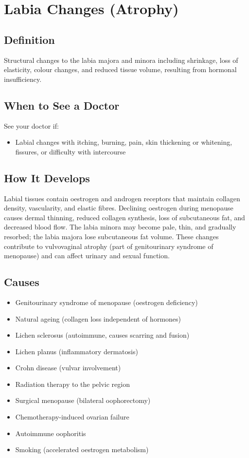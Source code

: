 \chapter{Labia Changes (Atrophy)}

\section*{Definition}
Structural changes to the labia majora and minora including shrinkage, loss of elasticity, colour changes, and reduced tissue volume, resulting from hormonal insufficiency.

\section*{When to See a Doctor}
See your doctor if:
\begin{itemize}
  \item Labial changes with itching, burning, pain, skin thickening or whitening, fissures, or difficulty with intercourse
\end{itemize}

\section*{How It Develops}
Labial tissues contain oestrogen and androgen receptors that maintain collagen density, vascularity, and elastic fibres. Declining oestrogen during menopause causes dermal thinning, reduced collagen synthesis, loss of subcutaneous fat, and decreased blood flow. The labia minora may become pale, thin, and gradually resorbed; the labia majora lose subcutaneous fat volume. These changes contribute to vulvovaginal atrophy (part of genitourinary syndrome of menopause) and can affect urinary and sexual function.

\section*{Causes}
\begin{itemize}
  \item Genitourinary syndrome of menopause (oestrogen deficiency)
  \item Natural ageing (collagen loss independent of hormones)
  \item Lichen sclerosus (autoimmune, causes scarring and fusion)
  \item Lichen planus (inflammatory dermatosis)
  \item Crohn disease (vulvar involvement)
  \item Radiation therapy to the pelvic region
  \item Surgical menopause (bilateral oophorectomy)
  \item Chemotherapy-induced ovarian failure
  \item Autoimmune oophoritis
  \item Smoking (accelerated oestrogen metabolism)
\end{itemize}


